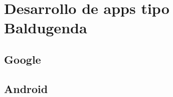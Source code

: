\chapter{Desarrollo de apps tipo Baldugenda}
\label{ch:desarrollo}



\section{Google}
\label{secc:google}

\newpage
\section{Android}
\label{secc:android}























